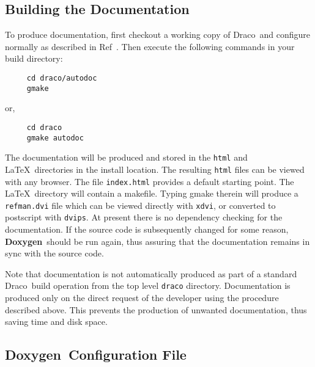 \documentclass[11pt]{ResearchNote}
\newcommand{\draco}{{\normalfont\sffamily Draco}}
\newcommand{\doxy}{{\normalfont\bfseries Doxygen}}
\begin{document}
\subsection{Building the Documentation}

To produce documentation, first checkout a working copy of \draco\ 
and configure normally as described in  Ref~\cite{draco-build}.
Then execute the following commands in your build directory:
\begin{verbatim} 
     cd draco/autodoc
     gmake 
\end{verbatim}
or,
\begin{verbatim} 
     cd draco
     gmake autodoc
\end{verbatim}
The documentation will be produced and stored in the
\texttt{html} and \LaTeX\ directories in the install location.
The resulting \texttt{html} files can be viewed with any browser. The
file \texttt{index.html} provides a default starting point. The \LaTeX\
directory will contain a makefile. Typing gmake therein will produce 
a \texttt{refman.dvi} file which can be viewed directly with \texttt{xdvi},
or converted to postscript with \texttt{dvips}. At present there
is no dependency checking for the documentation.
If the source code is subsequently changed for some reason,
\doxy\ should be run again, thus assuring that the documentation 
remains in sync with the source code.

Note that documentation is not automatically produced as part of 
a standard \draco\ build operation from the top level \texttt{draco} 
directory. Documentation is produced only on the direct request 
of the developer using the procedure described above. This prevents
the production of unwanted documentation, thus saving time and disk 
space.


\subsection{\doxy\ Configuration File}
\label{sec:config}
\end{document}
